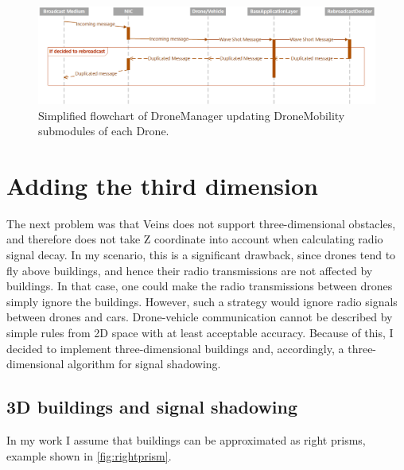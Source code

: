 \documentclass[]{nsm-thesis}
\begin{document}
\begin{figure}
	\centering
	\includegraphics[width=1\textwidth]{figures/RebroadcastDecider.png}
	\caption{Simplified flowchart of DroneManager updating DroneMobility submodules of each Drone.}
	\label{fig:rebroadcastdeciderseq}
\end{figure}



\section{Adding the third dimension}

The next problem was that Veins does not support three-dimensional obstacles, and therefore does not take Z coordinate into account when calculating radio signal decay. In my scenario, this is a significant drawback, since drones tend to fly above buildings, and hence their radio transmissions are not affected by buildings. In that case, one could make the radio transmissions between drones simply ignore the buildings. However, such a strategy would ignore radio signals between drones and cars. Drone-vehicle communication cannot be described by simple rules from 2D space with at least acceptable accuracy. Because of this, I decided to implement three-dimensional buildings and, accordingly, a three-dimensional algorithm for signal shadowing.



\subsection{3D buildings and signal shadowing}

In my work I assume that buildings can be approximated as right prisms, example shown in \cref{fig:rightprism}. 
\end{document}
